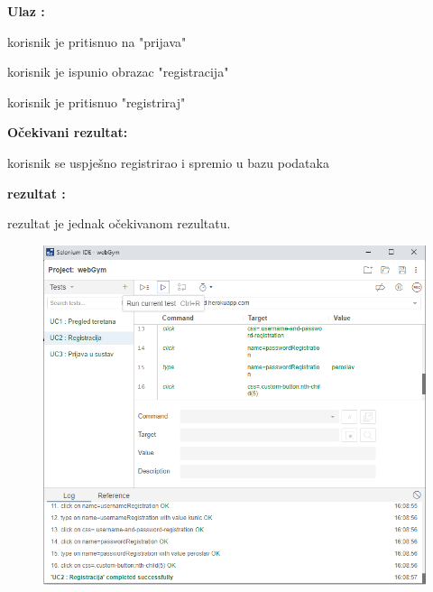 				\noindent {}
                \begin{packed_item}
						\item  \textbf{Ulaz : } 
						\item[] \begin{packed_enum}
	
							\item korisnik je pritisnuo na "prijava"
							\item korisnik je ispunio obrazac "registracija"
							\item korisnik je pritisnuo "registriraj"

						\end{packed_enum}
						\item  \textbf{Očekivani rezultat: } 
						\item[] \begin{packed_enum}
	
							\item korisnik se uspješno registrirao i spremio u bazu podataka

						\end{packed_enum}
						
						\item  \textbf{rezultat : }
						\item[] \begin{packed_enum}
	
							\item rezultat je jednak očekivanom rezultatu.

						\end{packed_enum}

				\end{packed_item}
				
				\begin{figure}[H]
        			\hspace*{-1.5cm}
        			\includegraphics[scale=0.5]{dijagrami/UC2.PNG} %
        			\centering
        			\label{fig:promjene}
	        	\end{figure}
				
